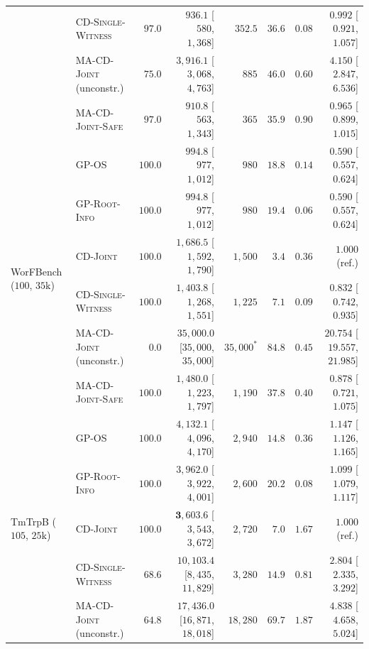 \documentclass{article}
\theoremstyle{plain}
\theoremstyle{definition}
\begin{document}
\begin{table}[!htbp]
{\begin{tabular}{@{}llrrrrrr@{}}
  & \textsc{CD-Single-Witness}       & $97.0$ & $936.1$ [$580$, $1{,}368$]           & $352.5$    & $36.6$ & $0.08$ & $0.992$ [$0.921$, $1.057$] \\
  & \textsc{MA-CD-Joint} (unconstr.) & $75.0$ & $3{,}916.1$ [$3{,}068$, $4{,}763$]   & $885$      & $46.0$ & $0.60$ & $4.150$ [$2.847$, $6.536$] \\
  & \textsc{MA-CD-Joint-Safe}        & $97.0$ & $\mathbf{910.8}$ [$563$, $1{,}343$]  & $365$      & $35.9$ & $0.90$ & $\mathbf{0.965}$ [$0.899$, $1.015$] \\
\midrule
\multirow{6}{*}{WorFBench ($100$, $35\mathrm{k}$)}
  & \textsc{GP-OS}                   & $100.0$ & $\mathbf{994.8}$ [$977$, $1{,}012$]  & $980$      & $18.8$ & $0.14$ & $0.590$ [$0.557$, $0.624$] \\
  & \textsc{GP-Root-Info}            & $100.0$ & $\mathbf{994.8}$ [$977$, $1{,}012$]  & $980$      & $19.4$ & $0.06$ & $0.590$ [$0.557$, $0.624$] \\
  & \textsc{CD-Joint}                & $100.0$ & $1{,}686.5$ [$1{,}592$, $1{,}790$]   & $1{,}500$  & $3.4$  & $0.36$ & $1.000$ (ref.) \\
  & \textsc{CD-Single-Witness}       & $100.0$ & $1{,}403.8$ [$1{,}268$, $1{,}551$]   & $1{,}225$  & $7.1$  & $0.09$ & $0.832$ [$0.742$, $0.935$] \\
  & \textsc{MA-CD-Joint} (unconstr.) & $0.0$   & $35{,}000.0$ [$35{,}000$, $35{,}000$] & $35{,}000^*$ & $84.8$ & $0.45$ & $20.754$ [$19.557$, $21.985$] \\
  & \textsc{MA-CD-Joint-Safe}        & $100.0$ & $1{,}480.0$ [$1{,}223$, $1{,}797$]   & $1{,}190$  & $37.8$ & $0.40$ & $0.878$ [$0.721$, $1.075$] \\
\midrule
\multirow{6}{*}{TmTrpB ($105$, $25\mathrm{k}$)}
  & \textsc{GP-OS}                   & $100.0$ & $4{,}132.1$ [$4{,}096$, $4{,}170$]   & $2{,}940$  & $14.8$ & $0.36$ & $1.147$ [$1.126$, $1.165$] \\
  & \textsc{GP-Root-Info}            & $100.0$ & $3{,}962.0$ [$3{,}922$, $4{,}001$]   & $2{,}600$  & $20.2$ & $0.08$ & $1.099$ [$1.079$, $1.117$] \\
  & \textsc{CD-Joint}                & $100.0$ & $\mathbf{3{,}603.6}$ [$3{,}543$, $3{,}672$] & $2{,}720$  & $7.0$  & $1.67$ & $1.000$ (ref.) \\
  & \textsc{CD-Single-Witness}       & $68.6$  & $10{,}103.4$ [$8{,}435$, $11{,}829$] & $3{,}280$  & $14.9$ & $0.81$ & $2.804$ [$2.335$, $3.292$] \\
  & \textsc{MA-CD-Joint} (unconstr.) & $64.8$  & $17{,}436.0$ [$16{,}871$, $18{,}018$] & $18{,}280$ & $69.7$ & $1.87$ & $4.838$ [$4.658$, $5.024$] \\

\end{tabular}}
\end{table}
\end{document}
